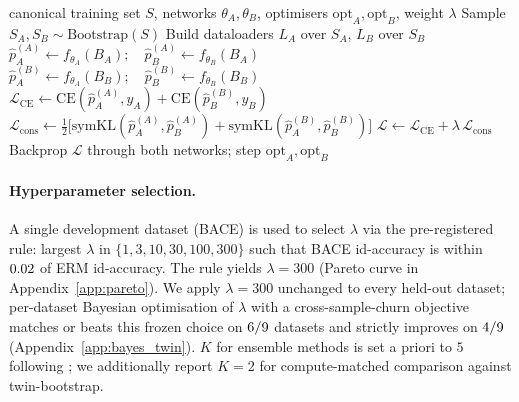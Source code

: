 \begin{algorithm}[H]
  \caption{Twin-bootstrap training (one epoch).}
  \label{alg:twin-bootstrap}
  \begin{algorithmic}[1]
    \Require canonical training set $S$, networks $\theta_A, \theta_B$,
             optimisers $\mathrm{opt}_A, \mathrm{opt}_B$, weight $\lambda$
    \State Sample $S_A, S_B \sim \mathrm{Bootstrap}(S)$
    \State Build dataloaders $L_A$ over $S_A$, $L_B$ over $S_B$
      \State $\hat{p}_A^{(A)} \gets f_{\theta_A}(B_A);\quad \hat{p}_B^{(A)} \gets f_{\theta_B}(B_A)$
      \State $\hat{p}_A^{(B)} \gets f_{\theta_A}(B_B);\quad \hat{p}_B^{(B)} \gets f_{\theta_B}(B_B)$
      \State $\mathcal{L}_{\mathrm{CE}} \gets \mathrm{CE}(\hat{p}_A^{(A)}, y_A) + \mathrm{CE}(\hat{p}_B^{(B)}, y_B)$
      \State $\mathcal{L}_{\mathrm{cons}} \gets \tfrac{1}{2}\big[\mathrm{symKL}(\hat{p}_A^{(A)}, \hat{p}_B^{(A)}) + \mathrm{symKL}(\hat{p}_A^{(B)}, \hat{p}_B^{(B)})\big]$
      \State $\mathcal{L} \gets \mathcal{L}_{\mathrm{CE}} + \lambda \, \mathcal{L}_{\mathrm{cons}}$
      \State Backprop $\mathcal{L}$ through both networks; step $\mathrm{opt}_A, \mathrm{opt}_B$
    \EndFor
  \end{algorithmic}
\end{algorithm}

\paragraph{Hyperparameter selection.}
A single development dataset (BACE) is used to select $\lambda$ via
the pre-registered rule: largest $\lambda$ in
$\{1, 3, 10, 30, 100, 300\}$ such that BACE id-accuracy is within
$0.02$ of ERM id-accuracy.  The rule yields $\lambda{=}300$
(Pareto curve in Appendix~\ref{app:pareto}).
We apply $\lambda{=}300$ unchanged to every held-out dataset; per-dataset
Bayesian optimisation of $\lambda$ with a cross-sample-churn objective
matches or beats this frozen choice on
$6/9$ datasets and
strictly improves on
$4/9$
(Appendix~\ref{app:bayes_twin}).
$K$ for ensemble methods is set a priori to $5$ following
\citet{lakshminarayanan2017simple}; we additionally report $K{=}2$ for
compute-matched comparison against twin-bootstrap.
